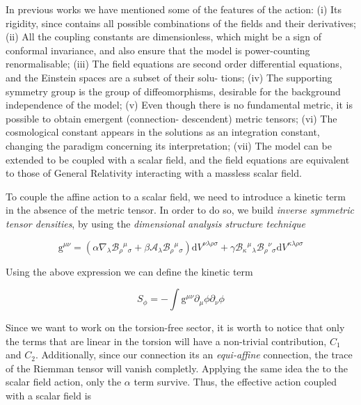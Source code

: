 \documentclass[10pt,a4paper]{article}
\begin{document}
In previous works we have mentioned some of the features of the action: (i) Its rigidity, since contains all possible combinations of the fields and their derivatives; 
(ii) All the coupling constants are dimensionless, which might be a sign of conformal invariance, and also ensure that the model is power-counting renormalisable; 
(iii) The field equations are second order differential equations, and the Einstein spaces are a subset of their solu- tions; 
(iv) The supporting symmetry group is the group of diffeomorphisms, desirable for the background independence of the model; 
(v) Even though there is no fundamental metric, it is possible to obtain emergent (connection- descendent) metric tensors; 
(vi) The cosmological constant appears in the solutions as an integration constant, changing the paradigm concerning its interpretation; 
(vii) The model can be extended to be coupled with a scalar field, and the field equations are equivalent to those of General Relativity interacting with a massless scalar field. 



To couple the affine action to a scalar field, we need to introduce a kinetic term in the absence of the metric tensor. In order to do so, we build 
\textit{inverse symmetric tensor densities}, by using the \textit{dimensional analysis structure technique}

\begin{equation}
      \mathrm{g}^{\mu\nu} = \left(\alpha \nabla_\lambda \mathcal{B}_{\rho}{ }^{\mu}{ }_{\sigma} + \beta \mathcal{A}_\lambda 
      \mathcal{B}_{\rho}{ }^{\mu}{ }_{\sigma}\right)\mathrm{d}V^{\nu\lambda\rho\sigma} + \gamma \mathcal{B}_{\kappa}{ }^{\mu}{ }_{\lambda}
      \mathcal{B}_{\rho}{ }^{\nu}{ }_{\sigma}\mathrm{d}V^{\kappa\lambda\rho\sigma}
\end{equation}

Using the above expression we can define the kinetic term 

\begin{equation}
    S_{\phi} = - \int \mathrm{g}^{\mu\nu} \partial_{\mu} \phi \partial_{\nu} \phi
\end{equation}

Since we want to work on the torsion-free sector, it is worth to notice that only the terms that are linear in the torsion will
have a non-trivial contribution, $C_1$ and $C_2$. Additionally, since our connection its an \textit{equi-affine} connection, the trace of the
Riemman tensor will vanish completly. Applying the same idea the to the scalar field action, only the $\alpha$ term survive. Thus,
the effective action coupled with a scalar field is
\end{document}
